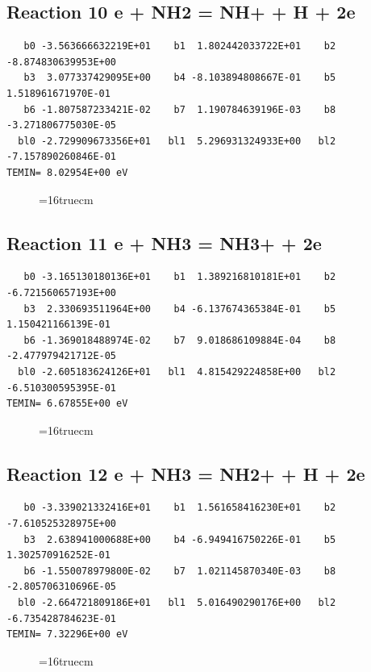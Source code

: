 \documentclass[12pt,dvipdfm]{article}
\begin{document}
\subsection{
Reaction 10 e + NH2 = NH+ + H + 2e}
\begin{small}\begin{verbatim}
   b0 -3.563666632219E+01    b1  1.802442033722E+01    b2 -8.874830639953E+00
   b3  3.077337429095E+00    b4 -8.103894808667E-01    b5  1.518961671970E-01
   b6 -1.807587233421E-02    b7  1.190784639196E-03    b8 -3.271806775030E-05
  bl0 -2.729909673356E+01   bl1  5.296931324933E+00   bl2 -7.157890260846E-01
TEMIN= 8.02954E+00 eV
   \end{verbatim}\end{small}
\begin{figure}[h!]
\label{n2rates}
\epsfxsize=16truecm
\end{figure}
\newpage

\subsection{
Reaction 11 e + NH3 = NH3+ + 2e}
\begin{small}\begin{verbatim}
   b0 -3.165130180136E+01    b1  1.389216810181E+01    b2 -6.721560657193E+00
   b3  2.330693511964E+00    b4 -6.137674365384E-01    b5  1.150421166139E-01
   b6 -1.369018488974E-02    b7  9.018686109884E-04    b8 -2.477979421712E-05
  bl0 -2.605183624126E+01   bl1  4.815429224858E+00   bl2 -6.510300595395E-01
TEMIN= 6.67855E+00 eV
   \end{verbatim}\end{small}
\begin{figure}[h!]
\label{n2rates}
\epsfxsize=16truecm
\end{figure}
\newpage

\subsection{
Reaction 12 e + NH3 = NH2+ + H + 2e}
\begin{small}\begin{verbatim}
   b0 -3.339021332416E+01    b1  1.561658416230E+01    b2 -7.610525328975E+00
   b3  2.638941000688E+00    b4 -6.949416750226E-01    b5  1.302570916252E-01
   b6 -1.550078979800E-02    b7  1.021145870340E-03    b8 -2.805706310696E-05
  bl0 -2.664721809186E+01   bl1  5.016490290176E+00   bl2 -6.735428784623E-01
TEMIN= 7.32296E+00 eV
   \end{verbatim}\end{small}
\begin{figure}[h!]
\label{n2rates}
\epsfxsize=16truecm
\end{figure}
\newpage
\end{document}
